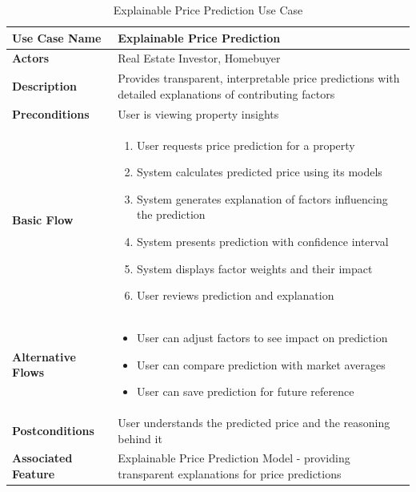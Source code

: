 \begin{table}[htbp]
	\centering
	\renewcommand{\arraystretch}{1.3}
	\begin{tabular}{|>{\columncolor[gray]{0.95}}p{}|p{}|}
		\hline
		\rowcolor[gray]{0.9} \textbf{Use Case Name} & \textbf{Explainable Price Prediction}                                                                    \\
		\hline
		\textbf{Actors}                             & Real Estate Investor, Homebuyer                                                                          \\
		\hline
		\textbf{Description}                        & Provides transparent, interpretable price predictions with detailed explanations of contributing factors \\
		\hline
		\textbf{Preconditions}                      & User is viewing property insights                                                                        \\
		\hline
		\textbf{Basic Flow}                         &                                                                                                          
		\begin{enumerate}
		\item User requests price prediction for a property
		\item System calculates predicted price using its models
		\item System generates explanation of factors influencing the prediction
		\item System presents prediction with confidence interval
		\item System displays factor weights and their impact
		\item User reviews prediction and explanation
		\end{enumerate} \\
		\hline
		\textbf{Alternative Flows}                  &                                                                                                          
		\begin{itemize}
		\item User can adjust factors to see impact on prediction
		\item User can compare prediction with market averages
		\item User can save prediction for future reference
		\end{itemize} \\
		\hline
		\textbf{Postconditions}                     & User understands the predicted price and the reasoning behind it                                         \\
		\hline
		\textbf{Associated Feature}                 & Explainable Price Prediction Model - providing transparent explanations for price predictions            \\
		\hline
	\end{tabular}
	\caption{Explainable Price Prediction Use Case}
	\label{tab:prediction-use-case}
\end{table}

